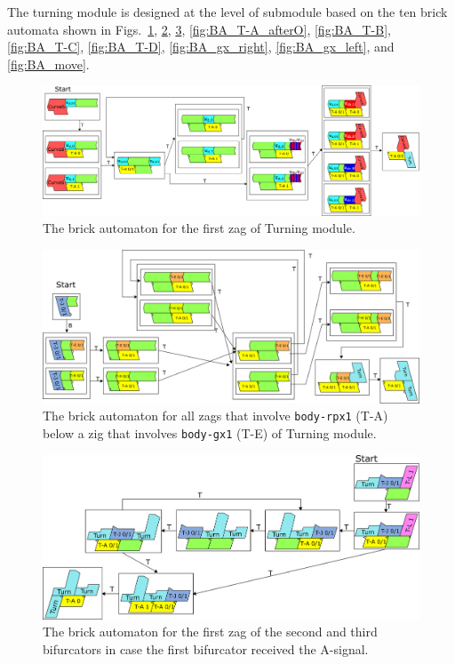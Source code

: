 \documentclass[dvipdfmx,review]{elsarticle}
\begin{document}
The turning module is designed at the level of submodule based on the ten brick automata shown in Figs.~\ref{fig:BA_T-A_under_DFAO}, \ref{fig:BA_T-A_under_gx_left}, \ref{fig:BA_T-A_afterA}, \ref{fig:BA_T-A_afterO}, \ref{fig:BA_T-B}, \ref{fig:BA_T-C}, \ref{fig:BA_T-D}, \ref{fig:BA_gx_right}, \ref{fig:BA_gx_left}, and \ref{fig:BA_move}. 

\begin{figure}[ht]
\centering
\includegraphics[width=\linewidth]{Figs/Turner_BA/T-A_under_DFAO.png}
\caption{The brick automaton for the first zag of Turning module.}
\label{fig:BA_T-A_under_DFAO}
\end{figure}

\begin{figure}[ht]
\centering
\includegraphics[width=\linewidth]{Figs/Turner_BA/T-A_under_gx_left.png}
\caption{The brick automaton for all zags that involve \texttt{body-rpx1} (T-A) below a zig that involves \texttt{body-gx1} (T-E) of Turning module.}
\label{fig:BA_T-A_under_gx_left}
\end{figure}

\begin{figure}[ht]
\centering
\includegraphics[width=\linewidth]{Figs/Turner_BA/T-A_afterA.png}
\caption{The brick automaton for the first zag of the second and third bifurcators in case the first bifurcator received the A-signal.}
\label{fig:BA_T-A_afterA}
\end{figure}
\end{document}

